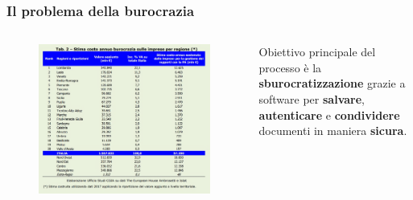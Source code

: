 \documentclass{beamer}
\begin{document}
\begin{frame}
	\frametitle{Il problema della burocrazia}
	\begin{columns}
		\begin{figure}
			\includegraphics[width=\textwidth]{buro2.png}
		\end{figure}
		Obiettivo principale del processo è la \textbf{sburocratizzazione}
		grazie a software per \textbf{salvare},
		\textbf{autenticare} e \textbf{condividere} documenti in maniera \textbf{sicura}.
	\end{columns}
\end{frame}
\end{document}
